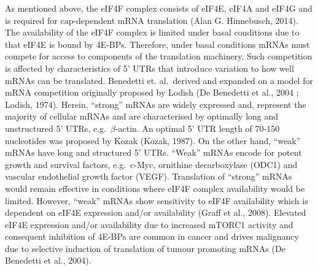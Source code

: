 \documentclass[
  12pt,
  openany]{book}
\begin{document}
As mentioned above, the eIF4F complex consists of eIF4E, eIF4A and eIF4G and is required for cap-dependent mRNA translation (Alan G. Hinnebusch, 2014). The availability of the eIF4F complex is limited under basal conditions due to that eIF4E is bound by 4E-BPs. Therefore, under basal conditions mRNAs must compete for access to components of the translation machinery. Such competition is affected by characteristics of 5' UTRs that introduce variation to how well mRNAs can be translated. Benedetti et. al.~derived and expanded on a model for mRNA competition originally proposed by Lodish (De Benedetti et al., 2004 ; Lodish, 1974). Herein, ``strong'' mRNAs are widely expressed and, represent the majority of cellular mRNAs and are characterised by optimally long and unstructured 5' UTRs, e.g.~\(\beta\)-actin. An optimal 5' UTR length of 70-150 nucleotides was proposed by Kozak (Kozak, 1987). On the other hand, ``weak'' mRNAs have long and structured 5' UTRs. ``Weak'' mRNAs encode for potent growth and survival factors, e.g.~c-Myc, ornithine decarboxylase (ODC1) and vascular endothelial growth factor (VEGF). Translation of ``strong'' mRNAs would remain effective in conditions where eIF4F complex availability would be limited. However, ``weak'' mRNAs show sensitivity to eIF4F availability which is dependent on eIF4E expression and/or availability (Graff et al., 2008). Elevated eIF4E expression and/or availability due to increased mTORC1 activity and consequent inhibition of 4E-BPs are common in cancer and drives malignancy due to selective induction of translation of tumour promoting mRNAs (De Benedetti et al., 2004).
\end{document}

